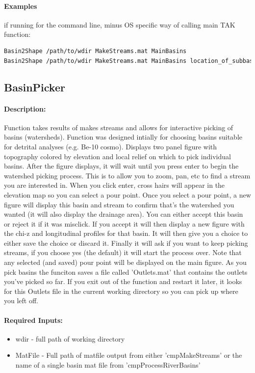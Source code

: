 \paragraph{Examples} if running for the command line, minus OS specific way of calling main TAK function:
\begin{lstlisting}[language=bash]
Basin2Shape /path/to/wdir MakeStreams.mat MainBasins
Basin2Shape /path/to/wdir MakeStreams.mat MainBasins location_of_subbasins MySubbasins include subdivided	
\end{lstlisting}

\subsection{BasinPicker}
\paragraph{Description:}
Function takes results of makes streams and allows for interactive picking of basins (watersheds). Function was
designed intially for choosing basins suitable for detrital analyses (e.g. Be-10 cosmo). Displays two panel figure 
with topography colored by elevation and local relief on which to pick individual basins. After the figure displays,
it will wait until you press enter to begin the watershed picking process. This is to allow you to zoom, pan, etc to 
find a stream you are interested in. When you click enter, cross hairs will appear in the elevation map so you can 
select a pour point. Once you select a pour point, a new figure will display this basin and stream to confirm that's 
the watershed you wanted (it will also display the drainage area). You can either accept this basin or reject it if 
it was misclick. If you accept it will then display a new figure with the chi-z and longitudinal profiles for that basin. 
It will then give you a choice to either save the choice or discard it. Finally it will ask if you want to keep picking 
streams, if you choose yes (the default) it will start the process over. Note that any selected (and saved) pour point 
will be displayed on the main figure. As you pick basins the funciton saves a file called 'Outlets.mat' that contains 
the outlets you've picked so far. If you exit out of the function and restart it later, it looks for this Outlets file
in the current working directory so you can pick up where you left off.

\paragraph{Required Inputs:}
\begin{itemize}
\item wdir - full path of working directory
\item MatFile - Full path of matfile output from either 'cmpMakeStreams' or the name of a single basin mat file from 'cmpProcessRiverBasins'
\end{itemize}


